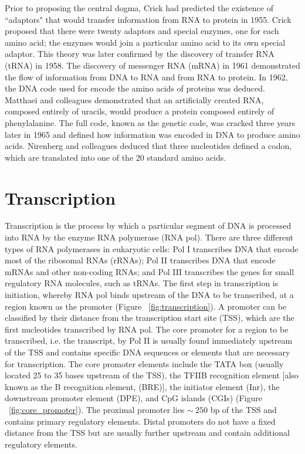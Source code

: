 Prior to proposing the central dogma, Crick had predicted the existence of ``adaptors" that would transfer information from RNA to protein in 1955\cite{cricktrna1955}. Crick proposed that there were twenty adaptors and special enzymes, one for each amino acid; the enzymes would join a particular amino acid to its own special adaptor. This theory was later confirmed by the discovery of transfer RNA (tRNA) in 1958\cite{pmid13538965}. The discovery of messenger RNA (mRNA) in 1961 \cite{BRENNER1961} demonstrated the flow of information from DNA to RNA and from RNA to protein. In 1962, the DNA code used for encode the amino acids of proteins was deduced\cite{pmid14471390}. Matthaei and colleagues demonstrated that an artificially created RNA, composed entirely of uracils, would produce a protein composed entirely of phenylalanine. The full code, known as the genetic code, was cracked three years later in 1965\cite{pmid5330357} and defined how information was encoded in DNA to produce amino acids. Nirenberg and colleagues deduced that three nucleotides defined a codon, which are translated into one of the 20 standard amino acids.

\section{Transcription}

Transcription is the process by which a particular segment of DNA is processed into RNA by the enzyme RNA polymerase (RNA pol). There are three different types of RNA polymerases in eukaryotic cells: Pol I transcribes DNA that encode most of the ribosomal RNAs (rRNAs); Pol II transcribes DNA that encode mRNAs and other non-coding RNAs; and Pol III transcribes the genes for small regulatory RNA molecules, such as tRNAs. The first step in transcription is initiation, whereby RNA pol binds upstream of the DNA to be transcribed, at a region known as the promoter (Figure ~\ref{fig:transcription}). A promoter can be classified by their distance from the transcription start site (TSS), which are the first nucleotides transcribed by RNA pol. The core promoter for a region to be transcribed, i.e. the transcript, by Pol II is usually found immediately upstream of the TSS and contains specific DNA sequences or elements that are necessary for transcription. The core promoter elements include the TATA box (usually located 25 to 35 bases upstream of the TSS), the TFIIB recognition element [also known as the B recognition element, (BRE)], the initiator element (Inr), the downstream promoter element (DPE), and CpG islands (CGIs) (Figure ~\ref{fig:core_promoter}). The proximal promoter lies $\sim~250$ bp of the TSS and contains primary regulatory elements. Distal promoters do not have a fixed distance from the TSS but are usually further upstream and contain additional regulatory elements.

